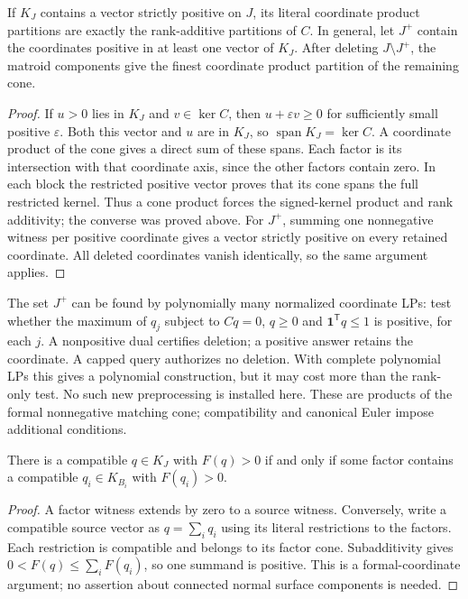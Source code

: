 \begin{proposition}
If $K_J$ contains a vector strictly positive on $J$, its literal coordinate
product partitions are exactly the rank-additive partitions of $C$.
In general, let $J^+$ contain the coordinates positive in at least one
vector of $K_J$.  After deleting $J\setminus J^+$, the matroid components
give the finest coordinate product partition of the remaining cone.
\end{proposition}
\begin{proof}
If $u>0$ lies in $K_J$ and $v\in\ker C$, then $u+\varepsilon v\ge0$ for
sufficiently small positive $\varepsilon$.  Both this vector and $u$ are
in $K_J$, so $\operatorname{span}K_J=\ker C$.  A coordinate product of
the cone gives a direct sum of these spans.  Each factor is its intersection
with that coordinate axis, since the other factors contain zero.
In each block the restricted
positive vector proves that its cone spans the full restricted kernel.
Thus a cone product forces the signed-kernel product and rank additivity;
the converse was proved above.  For $J^+$, summing one nonnegative witness
per positive coordinate gives a vector strictly positive on every retained
coordinate.  All deleted coordinates vanish identically, so the same
argument applies.
\end{proof}

The set $J^+$ can be found by polynomially many normalized coordinate LPs:
test whether the maximum of $q_j$ subject to $Cq=0$, $q\ge0$ and
$\mathbf1^{\mathsf T}q\le1$ is positive, for each $j$.
A nonpositive dual certifies deletion; a positive answer retains the
coordinate.  A capped query authorizes no deletion.  With complete polynomial
LPs this gives a polynomial construction, but it may cost more than the
rank-only test.  No such new preprocessing is installed here.  These are
products of the formal nonnegative matching cone; compatibility and canonical
Euler impose additional conditions.

\begin{proposition}
There is a compatible $q\in K_J$ with $F(q)>0$ if and only if some factor
contains a compatible $q_i\in K_{B_i}$ with $F(q_i)>0$.
\end{proposition}
\begin{proof}
A factor witness extends by zero to a source witness.  Conversely, write a
compatible source vector as $q=\sum_i q_i$ using its literal restrictions to
the factors.  Each restriction is compatible and belongs to its factor cone.
Subadditivity gives $0<F(q)\le\sum_iF(q_i)$, so one summand is positive.
This is a formal-coordinate argument; no assertion about connected normal
surface components is needed.
\end{proof}

